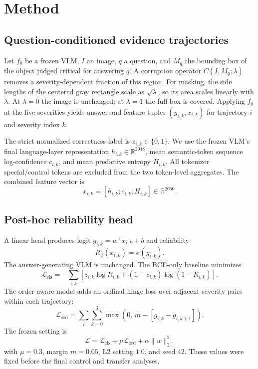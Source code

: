 \section{Method}
\label{sec:method}

\subsection{Question-conditioned evidence trajectories}

Let $f_\theta$ be a frozen VLM, $I$ an image, $q$ a question, and $M_q$ the bounding box of the object judged critical for answering $q$. A corruption operator $C(I,M_q;\lambda)$ removes a severity-dependent fraction of this region. For masking, the side lengths of the centered gray rectangle scale as $\sqrt{\lambda}$, so its area scales linearly with $\lambda$. At $\lambda=0$ the image is unchanged; at $\lambda=1$ the full box is covered. Applying $f_\theta$ at the five severities yields answer and feature tuples $(y_{i,k},x_{i,k})$ for trajectory $i$ and severity index $k$.

The strict normalized correctness label is $z_{i,k}\in\{0,1\}$. We use the frozen VLM's final language-layer representation $h_{i,k}\in\mathbb{R}^{2048}$, mean semantic-token sequence log-confidence $c_{i,k}$, and mean predictive entropy $H_{i,k}$. All tokenizer special/control tokens are excluded from the two token-level aggregates. The combined feature vector is
\begin{equation}
x_{i,k}=[h_{i,k};c_{i,k};H_{i,k}]\in\mathbb{R}^{2050}.
\end{equation}

\subsection{Post-hoc reliability head}

A linear head produces logit $g_{i,k}=w^\top x_{i,k}+b$ and reliability
\begin{equation}
R_\phi(x_{i,k})=\sigma(g_{i,k}).
\end{equation}
The answer-generating VLM is unchanged. The BCE-only baseline minimizes
\begin{equation}
\mathcal{L}_{\mathrm{cls}}=-\sum_{i,k}\left[z_{i,k}\log R_{i,k}+(1-z_{i,k})\log(1-R_{i,k})\right].
\end{equation}
The order-aware model adds an ordinal hinge loss over adjacent
severity pairs within each trajectory:
\begin{equation}
\mathcal{L}_{\mathrm{ord}}
=
\sum_i \sum_{k=0}^{3}
\max\left(0,\,
m-\left[g_{i,k}-g_{i,k+1}\right]
\right).
\end{equation}
The frozen setting is
\begin{equation}
\mathcal{L}=\mathcal{L}_{\mathrm{cls}}+\mu\mathcal{L}_{\mathrm{ord}}+\alpha\lVert w\rVert_2^2,
\end{equation}
with $\mu=0.3$, margin $m=0.05$, L2 setting $1.0$, and seed 42. These values were fixed before the final control and transfer analyses.

